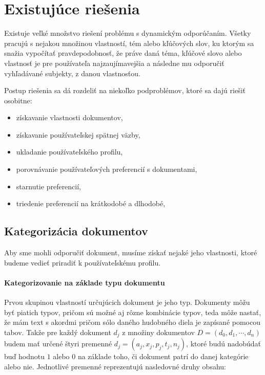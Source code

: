 \newpage

\section{Existujúce riešenia}

Existuje veľké množstvo riešení problému s dynamickým odporúčaním. Všetky pracujú s nejakou množinou vlastností, tém alebo kľúčových slov, ku ktorým sa snažia vypočítať pravdepodobnosť, že práve daná téma, kľúčové slovo alebo vlastnosť je pre používateľa najzaujímavejšia a následne mu odporučiť vyhľadávané subjekty, z danou vlastnosťou.

Postup riešenia sa dá rozdeliť na niekoľko podproblémov, ktoré sa dajú riešiť osobitne:

\begin{itemize}
\item{získavanie vlastnosti dokumentov,}
\item{získavanie používateľskej spätnej väzby,}
\item{ukladanie používateľského profilu,}
\item{porovnávanie používateľových preferencií s dokumentami,}
\item{starnutie preferencií,}
\item{triedenie preferencií na krátkodobé a dlhodobé,}
\end{itemize}

\subsection{Kategorizácia dokumentov}

Aby sme mohli odporučiť dokument, musíme získať nejaké jeho vlastnosti, ktoré budeme vedieť priradiť k používateľskému profilu. 

\paragraph{Kategorizovanie na základe typu dokumentu}

Prvou skupinou vlastností určujúcich dokument je jeho typ. Dokumenty môžu byť piatich typov, pričom sú možné aj rôzne kombinácie typov, teda môže nastať, že mám text s akordmi pričom sólo daného hudobného diela je zapísané pomocou tabov. Takže pre každý dokument \(d_j\) z množiny dokumentov \(D = (d_0, d_1, \cdots, d_n)\) budem mať určené štyri premenné \(d_j = (a_j, x_j, p_j, t_j, n_j)\), ktoré budú nadobúdať buď hodnotu \(1\) alebo \(0\) na základe toho, či dokument patrí do danej kategórie alebo nie. Jednotlivé premenné reprezentujú nasledovné druhy obsahu:


